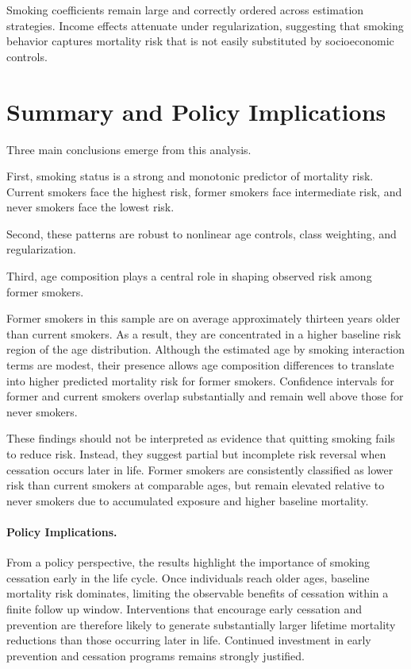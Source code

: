 \documentclass[12pt]{article}
\begin{document}
Smoking coefficients remain large and correctly ordered across estimation strategies. Income effects attenuate under regularization, suggesting that smoking behavior captures mortality risk that is not easily substituted by socioeconomic controls.

\FloatBarrier

\section{Summary and Policy Implications}

Three main conclusions emerge from this analysis.

First, smoking status is a strong and monotonic predictor of mortality risk. Current smokers face the highest risk, former smokers face intermediate risk, and never smokers face the lowest risk.

Second, these patterns are robust to nonlinear age controls, class weighting, and regularization.

Third, age composition plays a central role in shaping observed risk among former smokers.

Former smokers in this sample are on average approximately thirteen years older than current smokers. As a result, they are concentrated in a higher baseline risk region of the age distribution. Although the estimated age by smoking interaction terms are modest, their presence allows age composition differences to translate into higher predicted mortality risk for former smokers. Confidence intervals for former and current smokers overlap substantially and remain well above those for never smokers.

These findings should not be interpreted as evidence that quitting smoking fails to reduce risk. Instead, they suggest partial but incomplete risk reversal when cessation occurs later in life. Former smokers are consistently classified as lower risk than current smokers at comparable ages, but remain elevated relative to never smokers due to accumulated exposure and higher baseline mortality.

\paragraph{Policy Implications.}

From a policy perspective, the results highlight the importance of smoking cessation early in the life cycle. Once individuals reach older ages, baseline mortality risk dominates, limiting the observable benefits of cessation within a finite follow up window. Interventions that encourage early cessation and prevention are therefore likely to generate substantially larger lifetime mortality reductions than those occurring later in life. Continued investment in early prevention and cessation programs remains strongly justified.
\end{document}
